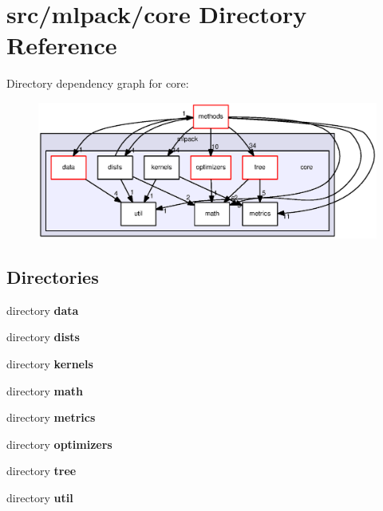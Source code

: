 \section{src/mlpack/core Directory Reference}
\label{dir_f7ac9cdfd28b2e882eb44d163e3b98b4}
Directory dependency graph for core\+:
\nopagebreak
\begin{figure}[H]
\begin{center}
\leavevmode
\includegraphics[width=350pt]{dir_f7ac9cdfd28b2e882eb44d163e3b98b4_dep}
\end{center}
\end{figure}
\subsection*{Directories}
\begin{DoxyCompactItemize}
\item 
directory {\bf data}
\item 
directory {\bf dists}
\item 
directory {\bf kernels}
\item 
directory {\bf math}
\item 
directory {\bf metrics}
\item 
directory {\bf optimizers}
\item 
directory {\bf tree}
\item 
directory {\bf util}
\end{DoxyCompactItemize}
